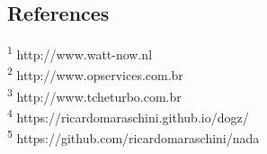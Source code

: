 \documentclass{article}
\begin{document}
\begin{multicols}{2}
\section{References}

\tiny \textsuperscript{1} http://www.watt-now.nl\\
\tiny \textsuperscript{2} http://www.opservices.com.br\\
\tiny \textsuperscript{3} http://www.tcheturbo.com.br\\
\tiny \textsuperscript{4} https://ricardomaraschini.github.io/dogz/\\
\tiny \textsuperscript{5} https://github.com/ricardomaraschini/nada

\end{multicols}
\end{document}
